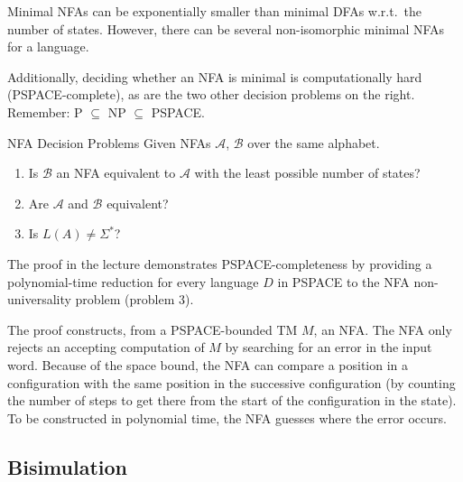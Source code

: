 \documentclass[english]{panikzettel}
\begin{document}
\begin{halfboxl}
    Minimal NFAs can be exponentially smaller than minimal DFAs w.r.t.\ the number of states.
    However, there can be several non-isomorphic minimal NFAs for a language.

    Additionally, deciding whether an NFA is minimal is computationally hard (PSPACE-complete), as are the two other decision problems on the right.
    Remember: P $\subseteq$ NP $\subseteq$ PSPACE.
\end{halfboxl}%
\begin{halfboxr}
    \vspace{-\baselineskip}
    \begin{defi}{NFA Decision Problems}
        Given NFAs $\mathcal{A}$, $\mathcal{B}$ over the same alphabet.

        \begin{enumerate}
            \item  Is $\mathcal{B}$ an NFA equivalent to $\mathcal{A}$ with the least possible number of states?
            \item Are $\mathcal{A}$ and $\mathcal{B}$ equivalent?
            \item Is $L(A) \neq \Sigma^*$?
        \end{enumerate}
    \end{defi}
\end{halfboxr}

The proof in the lecture demonstrates PSPACE-completeness by providing a polynomial-time reduction for every language $D$ in PSPACE to the NFA non-universality problem (problem 3).

The proof constructs, from a PSPACE-bounded TM $M$, an NFA.
The NFA only rejects an accepting computation of $M$ by searching for an error in the input word.
Because of the space bound, the NFA can compare a position in a configuration with the same position in the successive configuration (by counting the number of steps to get there from the start of the configuration in the state). To be constructed in polynomial time, the NFA guesses where the error occurs.

\subsection{Bisimulation}
\end{document}
